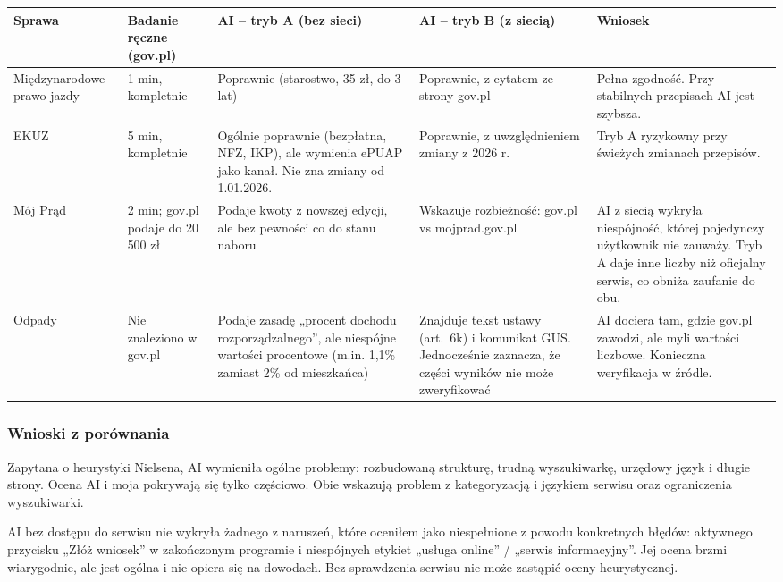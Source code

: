 \documentclass[11pt,a4paper]{article}
\begin{document}
{\footnotesize
\begin{tabularx}{\textwidth}{@{}L{2.3cm}L{2.2cm}YYY@{}}
\toprule
Sprawa & Badanie ręczne (gov.pl) & AI -- tryb A (bez sieci) & AI -- tryb B (z siecią) & Wniosek \\
\midrule
Międzynarodowe prawo jazdy & 1 min, kompletnie & Poprawnie (starostwo, 35 zł, do 3 lat) & Poprawnie, z cytatem ze strony gov.pl & Pełna zgodność. Przy stabilnych przepisach AI jest szybsza. \\
EKUZ & 5 min, kompletnie & Ogólnie poprawnie (bezpłatna, NFZ, IKP), ale wymienia ePUAP jako kanał. Nie zna zmiany od 1.01.2026. & Poprawnie, z uwzględnieniem zmiany z 2026 r. & Tryb A ryzykowny przy świeżych zmianach przepisów. \\
Mój Prąd & 2 min; gov.pl podaje do 20 500 zł & Podaje kwoty z nowszej edycji, ale bez pewności co do stanu naboru & Wskazuje rozbieżność: gov.pl vs mojprad.gov.pl & AI z siecią wykryła niespójność, której pojedynczy użytkownik nie zauważy. Tryb A daje inne liczby niż oficjalny serwis, co obniża zaufanie do obu. \\
Odpady & Nie znaleziono w gov.pl & Podaje zasadę „procent dochodu rozporządzalnego”, ale niespójne wartości procentowe (m.in. 1,1\% zamiast 2\% od mieszkańca) & Znajduje tekst ustawy (art.~6k) i komunikat GUS. Jednocześnie zaznacza, że części wyników nie może zweryfikować & AI dociera tam, gdzie gov.pl zawodzi, ale myli wartości liczbowe. Konieczna weryfikacja w źródle. \\
\bottomrule
\end{tabularx}
}

\subsubsection*{Wnioski z porównania}

Zapytana o heurystyki Nielsena, AI wymieniła ogólne problemy: rozbudowaną strukturę, trudną wyszukiwarkę, urzędowy język i długie strony. Ocena AI i moja pokrywają się tylko częściowo. Obie wskazują problem z kategoryzacją i językiem serwisu oraz ograniczenia wyszukiwarki.

AI bez dostępu do serwisu nie wykryła żadnego z naruszeń, które oceniłem jako niespełnione z powodu konkretnych błędów: aktywnego przycisku „Złóż wniosek” w zakończonym programie i niespójnych etykiet „usługa online” / „serwis informacyjny”. Jej ocena brzmi wiarygodnie, ale jest ogólna i nie opiera się na dowodach. Bez sprawdzenia serwisu nie może zastąpić oceny heurystycznej.
\end{document}
